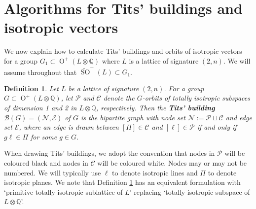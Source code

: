 \documentclass[12pt, a4paper]{article}
\newtheorem{defn}[theorem]{Definition}
\newcommand{\QQ}{\mathbb{Q}}
\newcommand{\bc}{\mathcal{B}}
\newcommand{\Cc}{\mathcal{C}}
\newcommand{\cc}{\mathcal{C}}
\newcommand{\ec}{\mathcal{E}}
\newcommand{\nc}{\mathcal{N}}
\newcommand{\pc}{\mathcal{P}}
\newcommand{\opn}{\operatorname}
\begin{document}
 \section{Algorithms for Tits' buildings and isotropic vectors}\label{BoundarySection}
We now explain how to calculate Tits' buildings and orbits of isotropic vectors  for a group $G_1 \subset \opn{O}^+(L \otimes \QQ)$ where $L$ is a lattice of signature $(2,n)$.
We will assume throughout that $\widetilde{\opn{SO}}^+(L) \subset G_1$.
\begin{defn}\label{TitsBuildingDefn}
  Let $L$ be a lattice of signature $(2,n)$.
  For a group $G \subset \opn{O}^+(L \otimes \QQ)$, 
  let $\pc$ and $\cc$ denote the $G$-orbits of totally isotropic subspaces of dimension 1 and 2 in $L \otimes \QQ$, respectively.
  Then the \textbf{Tits' building} $\bc(G) = (\nc, \ec) $ of $G$ is the bipartite graph with node set $\nc:=\pc \sqcup \cc$ and edge set $\ec$, where an edge is drawn between $[\Pi] \in \cc$ and $[\ell] \in \pc$ if and only if $g \ell \in \Pi$ for some $g \in G$.
\end{defn}
When drawing Tits' buildings, we adopt the convention that nodes in $\pc$ will be coloured black and nodes in $\Cc$ will be coloured white.
Nodes may or may not be numbered.
We will typically use $\ell$ to denote isotropic lines and $\Pi$ to denote isotropic planes.
We note that Definition \ref{TitsBuildingDefn} has an equivalent formulation with `primitive totally isotropic sublattice of $L$' replacing `totally isotropic subspace of $L \otimes \QQ$'.
\end{document}
